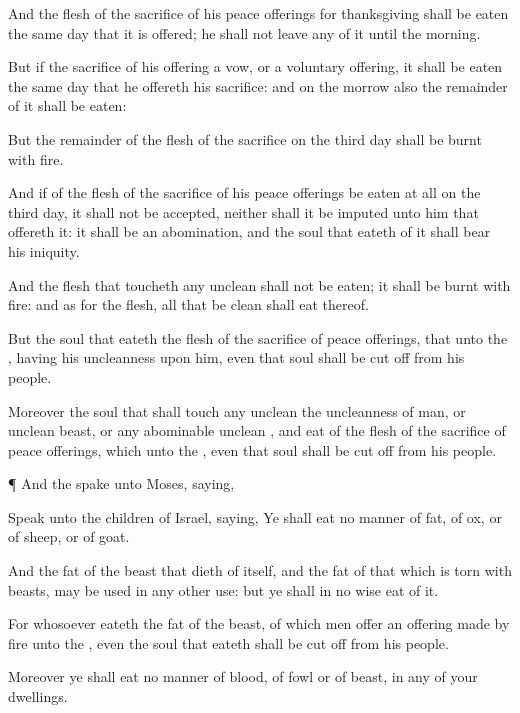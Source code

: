 {And the
flesh of the
sacrifice of his peace
offerings for
thanksgiving shall be
eaten the same
day that it is
offered; he shall not
leave any of it until the
morning.

But if the
sacrifice of his
offering
{} a
vow, or a voluntary
offering, it shall be
eaten the same
day that he
offereth his
sacrifice: and on the
morrow also the
remainder of it shall be
eaten:

But the
remainder of the
flesh of the
sacrifice on the
third
day shall be
burnt with
fire.

And if
{} of the
flesh of the
sacrifice of his peace
offerings be
eaten at
all on the
third
day, it shall not be
accepted, neither shall it be
imputed unto him that
offereth it: it shall be an
abomination, and the
soul that
eateth of it shall
bear his
iniquity.

And the
flesh that
toucheth any
unclean
{} shall not be
eaten; it shall be
burnt with
fire: and as for the
flesh, all that be
clean shall
eat thereof.

But the
soul that
eateth
{} the
flesh of the
sacrifice of peace
offerings, that
{} unto the
{}, having his
uncleanness upon him, even that
soul shall be cut
off from his
people.

Moreover the
soul that shall
touch any
unclean
{} the
uncleanness of
man, or
{}
unclean
beast, or any
abominable
unclean
{}, and
eat of the
flesh of the
sacrifice of peace
offerings, which
{} unto the
{}, even that
soul shall be cut
off from his
people.


\par }{\PP {}¶ And the
{}
spake unto
Moses,
saying,

Speak unto the
children of
Israel,
saying, Ye shall
eat no manner of
fat, of
ox, or of
sheep, or of
goat.

And the
fat of the beast that dieth of
itself, and the
fat of that which is torn with
beasts, may be
used in any other
use: but ye shall in no
wise
eat of it.

For whosoever
eateth the
fat of the
beast, of which men
offer an offering made by
fire unto the
{}, even the
soul that
eateth
{} shall be cut
off from his
people.

Moreover ye shall
eat no manner of
blood,
{} of
fowl or of
beast, in any of your
dwellings.

}

